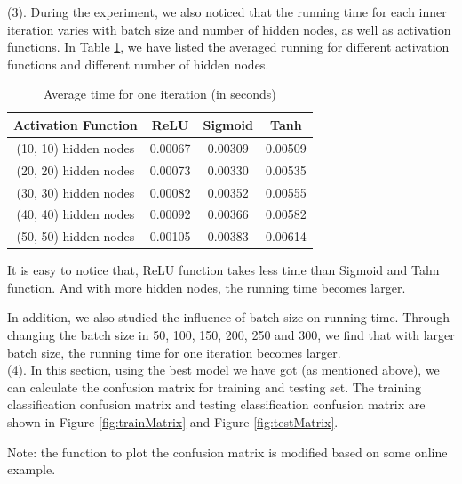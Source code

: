 (3). During the experiment, we also noticed that the running time for each inner iteration varies with batch size and number of hidden nodes, as well as activation functions. In Table \ref{table:time}, we have listed the averaged running for different activation functions and different number of hidden nodes.

\begin{table}[H]
	\centering
	\caption{Average time for one iteration (in seconds)}
	\label{table:time}	
	\begin{tabular}{c | c | c | c }
		\hline \hline
		Activation Function		&	ReLU	& 	Sigmoid		&	 Tanh 	\\[0.1cm]
		\hline
		(10, 10) hidden nodes	&	0.00067	&	0.00309		&	 0.00509 \\[0.1cm]
		(20, 20) hidden nodes	&	0.00073	&	0.00330		&	 0.00535 \\[0.1cm]
		(30, 30) hidden nodes	&	0.00082	&	0.00352		&	 0.00555 \\[0.1cm]
		(40, 40) hidden nodes	&	0.00092	&	0.00366		&	 0.00582 \\[0.1cm]
		(50, 50) hidden nodes	&	0.00105	&	0.00383		&	 0.00614 \\[0.1cm]
		\hline	
	\end{tabular}
\end{table}

It is easy to notice that, ReLU function takes less time than Sigmoid and Tahn function. And with more hidden nodes, the running time becomes larger.

In addition, we also studied the influence of batch size on running time. Through changing the batch size in 50, 100, 150, 200, 250 and 300, we find that with larger batch size, the running time for one iteration becomes larger.\\

(4). In this section, using the best model we have got (as mentioned above), we can calculate the confusion matrix for training and testing set. The training classification confusion matrix and testing classification confusion matrix are shown in Figure \ref{fig:trainMatrix} and Figure \ref{fig:testMatrix}.

Note: the function to plot the confusion matrix is modified based on some online example.

